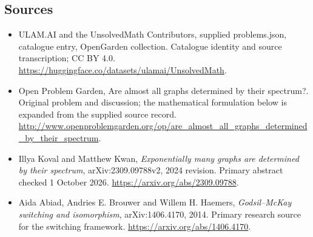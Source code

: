 \documentclass[11pt,a4paper]{article}
\begin{document}
\subsection{Sources}
\begin{itemize}
\item[S1] ULAM.AI and the UnsolvedMath Contributors, supplied problems.json, catalogue entry, OpenGarden collection. Catalogue identity and source transcription; CC BY 4.0.
\url{https://huggingface.co/datasets/ulamai/UnsolvedMath}.
\item[S2] Open Problem Garden, Are almost all graphs determined by their spectrum?. Original problem and discussion; the mathematical formulation below is expanded from the supplied source record.
\url{http://www.openproblemgarden.org/op/are_almost_all_graphs_determined_by_their_spectrum}.

\item[R1] Illya Koval and Matthew Kwan, \emph{Exponentially many
graphs are determined by their spectrum}, arXiv:2309.09788v2,
2024 revision. Primary abstract checked 1 October 2026.
\url{https://arxiv.org/abs/2309.09788}.
\item[R2] Aida Abiad, Andries E. Brouwer and Willem H. Haemers,
\emph{Godsil--McKay switching and isomorphism}, arXiv:1406.4170,
2014. Primary research source for the switching framework.
\url{https://arxiv.org/abs/1406.4170}.

\end{itemize}
\end{document}
